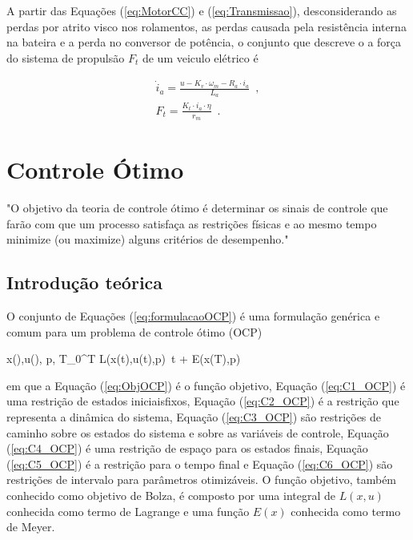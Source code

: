 A partir das Equações (\ref{eq:MotorCC}) e (\ref{eq:Transmissao}), desconsiderando as perdas por atrito visco nos rolamentos, as perdas causada pela resistência interna na bateira e
a perda no conversor de potência, o conjunto que descreve o a força do sistema de propulsão $F_t$ de um veiculo elétrico é

\begin{subequations}
	\label{eq:propulsao}
	\begin{align}
		\dot i_{a} = \frac{u - K_{v} \cdot \omega_{m} - R_{a} \cdot i_{a}}{L_{a}}\enspace, \label{eq:propulsao_1} \\
		F_{t} =  \frac{K_t \cdot i_a \cdot \eta}{r_m}\enspace. \label{eq:propulsao_2}
	\end{align}
\end{subequations}

\section{Controle Ótimo}

"O objetivo da teoria de controle ótimo é determinar os sinais de controle que farão com que um processo satisfaça as restrições físicas e ao mesmo
tempo minimize
(ou maximize) alguns critérios de desempenho."\cite{book:Kirk}

\subsection{Introdução teórica}

O conjunto de Equações (\ref{eq:formulacaoOCP}) é uma formulação genérica e comum para um problema de controle ótimo (OCP)


\begin{mini!}
	{x(\cdot),u(\cdot), p, T}{\int_{0}^{T} L(x(t),u(t),p) \,t \;+\; E(x(T),p) \label{eq:ObjOCP}}
	{\label{eq:formulacaoOCP}}{}
\end{mini!}

em que a Equação (\ref{eq:ObjOCP}) é o função objetivo, Equação (\ref{eq:C1_OCP}) é uma restrição de estados iniciaisfixos, Equação (\ref{eq:C2_OCP}) é
a restrição
que representa a dinâmica
do sistema, Equação (\ref{eq:C3_OCP}) são restrições de caminho sobre os estados do sistema e sobre as variáveis de controle, Equação (\ref{eq:C4_OCP})
é uma restrição de espaço para os estados finais, Equação (\ref{eq:C5_OCP}) é a restrição para o tempo final e Equação (\ref{eq:C6_OCP}) são restrições de intervalo para parâmetros otimizáveis.
O função objetivo, também conhecido como objetivo de Bolza, é composto por uma integral de $L(x,u)$ conhecida como termo de Lagrange
e uma função $E(x)$ conhecida como termo de Meyer\cite{book:Numerical_Optimal_Control}.


